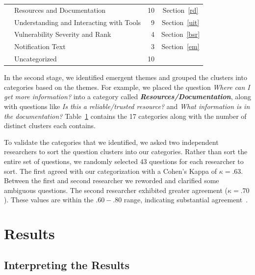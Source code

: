 \documentclass{acm_proc_article-sp}
\begin{document}
\begin{table}
\begin{tabularx}{\textwidth}{|l|X|r|c|}
   	 									& Resources and Documentation									& 10     		& Section~\ref{rd}		\\
   	 									
 
    									
    									& Understanding and Interacting with Tools						& 9     		& Section~\ref{uit}			\\

										& Vulnerability Severity and Rank								& 4     		& Section~\ref{bsr}		\\
 
    									& Notification Text												& 3     		& Section~\ref{em}		\\
  
    \hline	
       									& Uncategorized													& 10    		&			 \\
    \hline
\end{tabularx}
\label{table:categories}
\end{table}


In the second stage, we identified emergent themes and grouped the clusters into categories based on the themes. 
For example, we placed the question \textit{Where can I get more information?} into a category called \emph{\textbf{Resources/Documentation}}, along with questions like \textit{Is this a reliable/trusted resource?} and \textit{What information is in the documentation?} 
Table~\ref{table:categories} contains the 17 categories along with the number of distinct clusters each contains. 

To validate the categories that we identified, we asked two independent researchers to sort the question clusters into our categories. 
Rather than sort the entire set of questions, we randomly selected 43 questions for each researcher to sort.
The first agreed with our categorization with a Cohen's Kappa of $\kappa = .63$. 
Between the first and second researcher we reworded and clarified some ambiguous questions. The second researcher exhibited greater agreement ($\kappa = .70$). 
These values are within the $.60 - .80$ range, indicating substantial agreement~\cite{Landis1977agreement}.

\section{Results}

\subsection{Interpreting the Results}
\label{sec:results}
\end{document}
